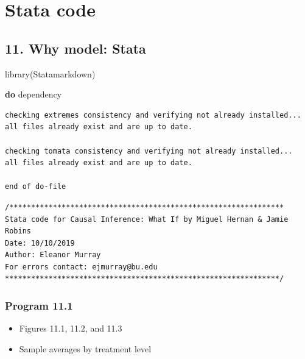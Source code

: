 \documentclass[
  10pt,
]{book}
\newenvironment{Shaded}{\begin{snugshade}}{\end{snugshade}}
\newcommand{\FunctionTok}[1]{\textcolor[rgb]{0.00,0.00,0.00}{#1}}
\newcommand{\KeywordTok}[1]{\textcolor[rgb]{0.13,0.29,0.53}{\textbf{#1}}}
\newcommand{\NormalTok}[1]{#1}
\providecommand{\tightlist}{%
  \setlength{\itemsep}{0pt}\setlength{\parskip}{0pt}}
\begin{document}
\hypertarget{part-stata-code}{%
\part*{Stata code}\label{part-stata-code}}

\hypertarget{why-model-stata}{%
\chapter*{11. Why model: Stata}\label{why-model-stata}}

\begin{Shaded}
\begin{Highlighting}[]
\FunctionTok{library}\NormalTok{(Statamarkdown)}
\end{Highlighting}
\end{Shaded}

\begin{Shaded}
\begin{Highlighting}[]
\KeywordTok{do}\NormalTok{ dependency}
\end{Highlighting}
\end{Shaded}

\begin{verbatim}
checking extremes consistency and verifying not already installed...
all files already exist and are up to date.

checking tomata consistency and verifying not already installed...
all files already exist and are up to date.

end of do-file
\end{verbatim}

\begin{verbatim}
/***************************************************************
Stata code for Causal Inference: What If by Miguel Hernan & Jamie Robins
Date: 10/10/2019
Author: Eleanor Murray 
For errors contact: ejmurray@bu.edu
***************************************************************/
\end{verbatim}

\hypertarget{program-11.1-1}{%
\section{Program 11.1}\label{program-11.1-1}}

\begin{itemize}
\tightlist
\item
  Figures 11.1, 11.2, and 11.3
\item
  Sample averages by treatment level
\end{itemize}
\end{document}

